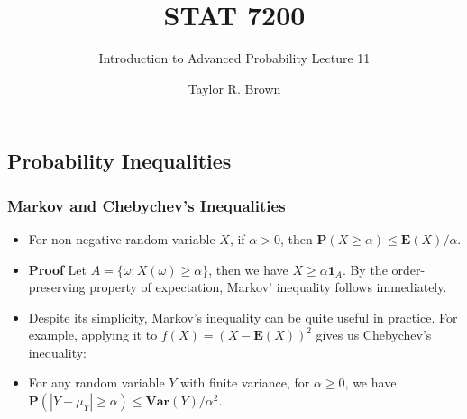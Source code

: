 \documentclass[handout]{beamer}
\title{STAT 7200}
\subtitle{Introduction to Advanced Probability \newline Lecture 11}
\author{Taylor R. Brown}
\institute{}
\date{}
\newcommand{\BP}{\mathbf{P}}
\newcommand{\BE}{\mathbf{E}}
\newcommand{\BI}{\mathbf{1}}
\newcommand{\BV}{\mathbf{Var}}
\begin{document}
\frame{\titlepage}

\section[Outline]{}



\subsection{Probability Inequalities}





\frame
{
  \frametitle{Markov and Chebychev's Inequalities}

   \begin{itemize}
       \item<1->[]
   \begin{Theorem} For non-negative random variable $X$, if $\alpha>0$, then $\BP(X\geq \alpha)\leq \BE(X)/\alpha$. 
   \end{Theorem}

\item<2-> \textbf{Proof} Let $A=\{\omega: X(\omega)\geq \alpha \}$, then we have $X\geq \alpha \BI_{A}$. By the order-preserving property of expectation,  Markov' inequality follows immediately. 

\item<3-> Despite its simplicity, Markov's inequality can be quite useful in practice. For example, applying it to $f(X)=(X-\BE(X))^2$ gives us Chebychev's inequality:

\item<4->[] 
   \begin{Corollary} For any random variable $Y$ with finite variance, for $\alpha\geq 0$, we have $\BP(|Y-\mu_Y|\geq \alpha)\leq \BV(Y)/\alpha^2$. 
   \end{Corollary}

         
\end{itemize}
}
\end{document}
